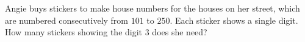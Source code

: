 Angie buys stickers to make house numbers for the houses on her street, which are numbered consecutively from $101$ to $250$. Each sticker shows a single digit. How many stickers showing the digit $3$ does she need?
